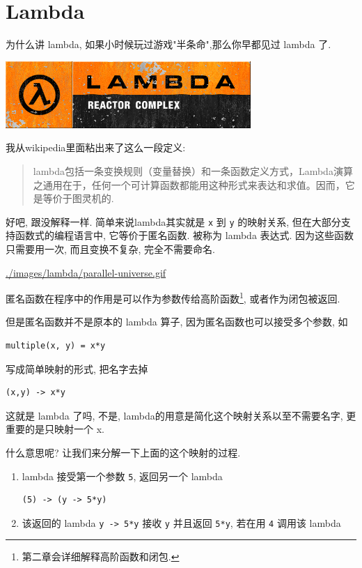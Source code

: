 \documentclass[a5paper]{book}
\begin{document}
\part{Lambda}
\label{sec:orgheadline9}
为什么讲 lambda, 如果小时候玩过游戏"半条命",那么你早都见过 lambda 了.

\includegraphics[width=.9\linewidth]{./images/lambda/Lambda_reactor_complex_logo.png}

我从wikipedia里面粘出来了这么一段定义:
\begin{quote}
lambda包括一条变换规则（变量替换）和一条函数定义方式，Lambda演算之通用在于，任何一个可计算函数都能用这种形式来表达和求值。因而，它是等价于图灵机的.
\end{quote}

好吧, 跟没解释一样. 简单来说lambda其实就是 \texttt{x} 到 \texttt{y} 的映射关系, 但在大部分支持函数式的编程语言中,
它等价于匿名函数. 被称为 lambda 表达式.
因为这些函数只需要用一次, 而且变换不复杂, 完全不需要命名.

\url{./images/lambda/parallel-universe.gif}

匿名函数在程序中的作用是可以作为参数传给高阶函数\footnote{第二章会详细解释高阶函数和闭包.}, 或者作为闭包被返回.

但是匿名函数并不是原本的 lambda 算子, 因为匿名函数也可以接受多个参数, 如

\begin{verbatim}
multiple(x, y) = x*y
\end{verbatim}

写成简单映射的形式, 把名字去掉

\begin{verbatim}
(x,y) -> x*y
\end{verbatim}

这就是 lambda 了吗, 不是, lambda的用意是简化这个映射关系以至不需要名字,
更重要的是只映射一个 x.

什么意思呢? 让我们来分解一下上面的这个映射的过程.

\begin{enumerate}
\item lambda 接受第一个参数 \texttt{5}, 返回另一个 lambda

\begin{verbatim}
(5) -> (y -> 5*y)
\end{verbatim}

\item 该返回的 lambda \texttt{y -> 5*y} 接收 \texttt{y} 并且返回 \texttt{5*y}, 若在用 \texttt{4} 调用该 lambda
\end{enumerate}
\end{document}
